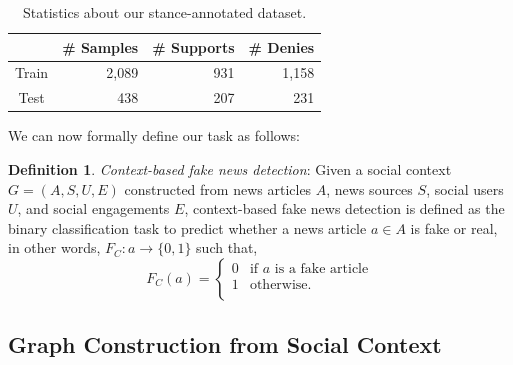 \documentclass[sigconf]{acmart}
\theoremstyle{definition}
\newtheorem{definition}{Definition}[section]
\theoremstyle{hypothesis}
\newtheorem{hypothesis}{Hypothesis}[section]
\begin{document}
\begin{table}[t]
  \centering
  \small
  \caption{Statistics about our stance-annotated dataset.}
  \begin{tabular}{crrr}
  \toprule
     & \bf \# Samples & \bf \# Supports & \bf \# Denies \\ 
    \midrule
  Train & 2,089 & 931 & 1,158 \\
  Test & 438 & 207 & 231 \\ 
  \bottomrule
  \end{tabular}
  \label{table:stance_statistics}
\end{table}

We can now formally define our task as follows: 
\begin{definition}{\textit{Context-based fake news detection}}: Given a social context $G = (A,S,U,E)$ constructed from news articles $A$, news sources $S$, social users $U$, and social engagements $E$, context-based fake news detection is defined as the binary classification task to predict whether a news article $a\in A$ is fake or real, in other words, %
$F_C : a \rightarrow \{0,1\}$ such that,
\[  F_C(a) = \left\{
\begin{array}{ll}
      0 & \textrm{if } a \textrm{ is a fake article} \\
      1 & \textrm{otherwise}. \\
\end{array} 
\right. \]
\end{definition}



\subsection{Graph Construction from Social Context}
\label{sec:graph_construction}
\end{document}
